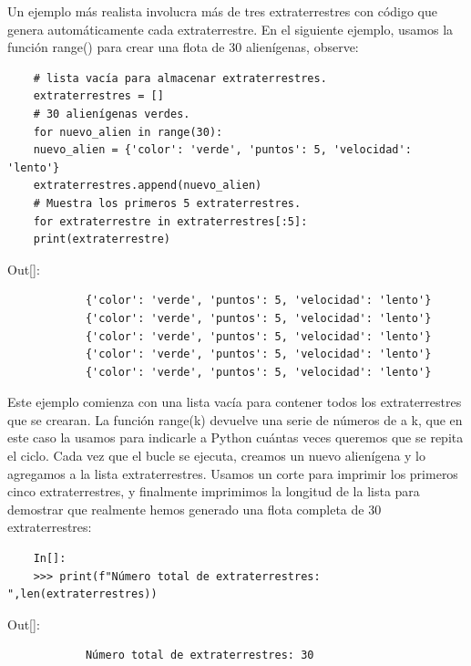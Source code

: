 Un ejemplo más realista involucra más de tres extraterrestres con código que genera automáticamente cada extraterrestre. En el siguiente ejemplo, usamos la función {\ttfamily range()} para crear una flota de 30 alienígenas, observe:

\hspace{-2.5cm}{\ttfamily \scriptsize aliens.py}  \vspace{-0.5cm}
\begin{lstlisting}	
	# lista vacía para almacenar extraterrestres.
	extraterrestres = []
	# 30 alienígenas verdes.
	for nuevo_alien in range(30):
	nuevo_alien = {'color': 'verde', 'puntos': 5, 'velocidad': 'lento'}
	extraterrestres.append(nuevo_alien)
	# Muestra los primeros 5 extraterrestres.
	for extraterrestre in extraterrestres[:5]:
	print(extraterrestre)
\end{lstlisting}	

{\ttfamily\scriptsize\scriptsize \noindent Out[]: \vspace{-0.3cm}	
	{\color{blue}	
		\begin{verbatim}
			{'color': 'verde', 'puntos': 5, 'velocidad': 'lento'}
			{'color': 'verde', 'puntos': 5, 'velocidad': 'lento'}
			{'color': 'verde', 'puntos': 5, 'velocidad': 'lento'}
			{'color': 'verde', 'puntos': 5, 'velocidad': 'lento'}
			{'color': 'verde', 'puntos': 5, 'velocidad': 'lento'}
		\end{verbatim}
}}

Este ejemplo comienza con una lista vacía para contener todos los extraterrestres que se crearan. La función {\ttfamily range(k)} devuelve una serie de números de {} a {\ttfamily k}, que en este caso la usamos para indicarle a Python cuántas veces queremos que se repita el ciclo. Cada vez que el bucle se ejecuta, creamos un nuevo alienígena  y lo agregamos a la lista extraterrestres. Usamos un corte para imprimir los primeros cinco extraterrestres, y finalmente imprimimos la longitud de la lista para demostrar que realmente hemos generado una flota completa de 30 extraterrestres:

\hspace{-2.5cm}{\ttfamily \scriptsize }  \vspace{-0.5cm}
\begin{lstlisting}	
	In[]:
	>>> print(f"Número total de extraterrestres: ",len(extraterrestres))
\end{lstlisting}	
{\ttfamily\scriptsize\scriptsize \noindent Out[]: \vspace{-0.3cm}	
	{\color{blue} 	
		\begin{verbatim}
			Número total de extraterrestres: 30
		\end{verbatim}
}}



